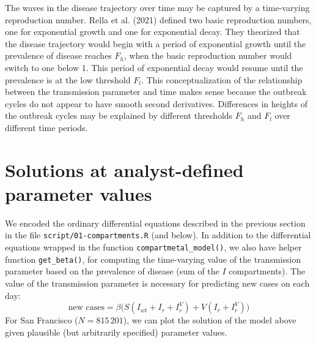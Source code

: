\documentclass[
  11pt,
  letterpaper,
  DIV=11,
  numbers=noendperiod]{scrartcl}
\begin{document}
The waves in the disease trajectory over time may be captured by a
time-varying reproduction number. Rella et al. (2021) defined two basic
reproduction numbers, one for exponential growth and one for exponential
decay. They theorized that the disease trajectory would begin with a
period of exponential growth until the prevalence of disease reaches
\(F_h\), when the basic reproduction number would switch to one below 1.
This period of exponential decay would resume until the prevalence is at
the low threshold \(F_l\). This conceptualization of the relationship
between the transmission parameter and time makes sense because the
outbreak cycles do not appear to have smooth second derivatives.
Differences in heights of the outbreak cycles may be explained by
different thresholds \(F_h\) and \(F_l\) over different time periods.

\hypertarget{solutions-at-analyst-defined-parameter-values-1}{%
\section{Solutions at analyst-defined parameter
values}\label{solutions-at-analyst-defined-parameter-values-1}}

We encoded the ordinary differential equations described in the previous
section in the file \texttt{script/01-compartments.R} (and below). In
addition to the differential equations wrapped in the function
\texttt{compartmetal\_model()}, we also have helper function
\texttt{get\_beta()}, for computing the time-varying value of the
transmission parameter based on the prevalence of disease (sum of the
\(I\) compartments). The value of the transmission parameter is
necessary for predicting new cases on each day:
\[\text{new cases} = \beta \big(
S (I_{wt} + I_r + I_r^V) + V (I_r + I_r^V)
\big)\] For San Francisco (\(N = 815\,201\)), we can plot the solution
of the model above given plausible (but arbitrarily specified) parameter
values.
\end{document}

